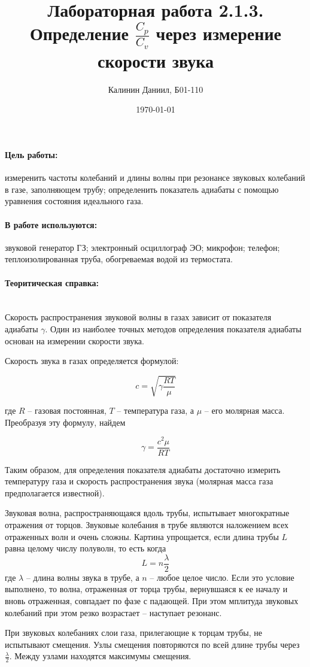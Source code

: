 \documentclass[a4paper, 12pt]{article}
\author{Калинин Даниил, Б01-110}
\date{\today}
\title{Лабораторная работа 2.1.3.\\Определение $\frac{C_p}{C_v}$ через измерение скорости звука}
\newcommand{\parag}[1]{\paragraph*{#1:}}
\begin{document}
\maketitle

\parag {Цель работы} измеренить частоты колебаний и длины волны при резонансе звуковых колебаний в газе, заполняющем трубу; определенить показатель адиабаты с помощью уравнения состояния идеального газа.

\parag {В работе используются}
звуковой генератор ГЗ; электронный осциллограф ЭО; микрофон; телефон; теплоизолированная труба, обогреваемая водой из термостата.

\parag {Теоритическая справка} ~\\
Скорость распространения звуковой волны в газах зависит от показателя адиабаты $ \gamma $. Один из наиболее точных методов определения показателя адиабаты основан на измерении скорости звука.
    
Скорость звука в газах определяется формулой:
    
\begin{equation}
    \label{speed_of_sound}
    c=\sqrt{\gamma\frac{RT}{\mu}}
\end{equation}

где $ R $ -- газовая постоянная, $ T $ -- температура газа, а $ \mu $ -- его молярная масса. Преобразуя эту формулу, найдем

\begin{equation}
    \label{gamma}
    \gamma = \frac{c^2 \mu}{RT}
\end{equation}
    
Таким образом, для определения показателя адиабаты достаточно измерить температуру газа и скорость распространения звука (молярная масса газа предполагается известной).
    
Звуковая волна, распространяющаяся вдоль трубы, испытывает многократные отражения от торцов. Звуковые колебания в трубе являются наложением всех отраженных волн и очень сложны. Картина упрощается, если длина трубы $L$ равна целому числу полуволн, то есть когда \[L=n \frac{\lambda}{2}\] где $\lambda$ -- длина волны звука в трубе, а $n$ -- любое целое число. Если это условие выполнено, то волна, отраженная от торца трубы, вернувшаяся к ее началу и вновь отраженная, совпадает по фазе с падающей. При этом мплитуда звуковых колебаний при этом резко возрастает -- наступает резонанс.
    
При звуковых колебаниях слои газа, прилегающие к торцам трубы, не испытывают смещения. Узлы смещения повторяются по всей длине трубы через $\frac{\lambda}{2}$. Между узлами находятся максимумы смещения.
    
\end{document}
